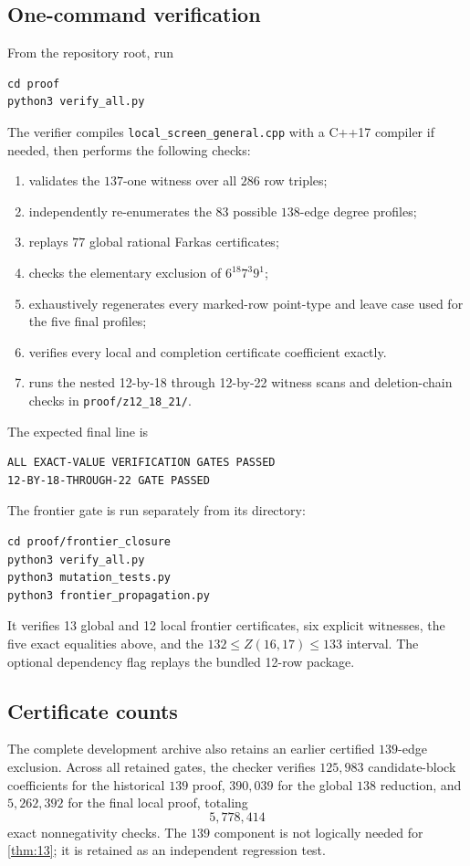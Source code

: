 \documentclass[10pt,a4paper]{amsart}
\begin{document}
\subsection{One-command verification}
From the repository root, run
\begin{verbatim}
cd proof
python3 verify_all.py
\end{verbatim}
The verifier compiles \texttt{local\_screen\_general.cpp} with a C++17 compiler if needed, then performs the following checks:
\begin{enumerate}[label=\arabic*.]
\item validates the $137$-one witness over all $286$ row triples;
\item independently re-enumerates the $83$ possible $138$-edge degree profiles;
\item replays $77$ global rational Farkas certificates;
\item checks the elementary exclusion of $6^{18}7^3 9^1$;
\item exhaustively regenerates every marked-row point-type and leave case used for the five final profiles;
\item verifies every local and completion certificate coefficient exactly.
\item runs the nested 12-by-18 through 12-by-22 witness scans and deletion-chain checks in \texttt{proof/z12\_18\_21/}.
\end{enumerate}
The expected final line is
\begin{verbatim}
ALL EXACT-VALUE VERIFICATION GATES PASSED
12-BY-18-THROUGH-22 GATE PASSED
\end{verbatim}
The frontier gate is run separately from its directory:
\begin{verbatim}
cd proof/frontier_closure
python3 verify_all.py
python3 mutation_tests.py
python3 frontier_propagation.py
\end{verbatim}
It verifies 13 global and 12 local frontier certificates, six explicit
witnesses, the five exact equalities above, and the $132\le Z(16,17)\le133$
interval. The optional dependency flag replays the bundled 12-row package.

\subsection{Certificate counts}
The complete development archive also retains an earlier certified $139$-edge exclusion. Across all retained gates, the checker verifies $125{,}983$ candidate-block coefficients for the historical $139$ proof, $390{,}039$ for the global $138$ reduction, and $5{,}262{,}392$ for the final local proof, totaling
\[
 5{,}778{,}414
\]
exact nonnegativity checks. The $139$ component is not logically needed for \cref{thm:13}; it is retained as an independent regression test.
\end{document}
